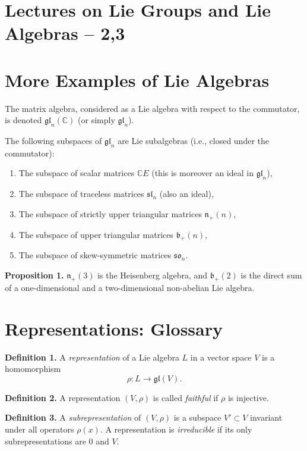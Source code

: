 \section*{Lectures on Lie Groups and Lie Algebras – 2,3}

\section*{More Examples of Lie Algebras}

The matrix algebra, considered as a Lie algebra with respect to the commutator,
is denoted $\mathfrak{gl}_n(\mathbb{C})$ (or simply $\mathfrak{gl}_n$).

The following subspaces of $\mathfrak{gl}_n$ are Lie subalgebras (i.e., closed under the commutator):

\begin{enumerate}
\item The subspace of scalar matrices $\mathbb{C}E$ (this is moreover an ideal in $\mathfrak{gl}_n$),
\item The subspace of traceless matrices $\mathfrak{sl}_n$ (also an ideal),
\item The subspace of strictly upper triangular matrices $\mathfrak{n}_+(n)$,
\item The subspace of upper triangular matrices $\mathfrak{b}_+(n)$,
\item The subspace of skew-symmetric matrices $\mathfrak{so}_n$.
\end{enumerate}

\textbf{Proposition 1.}
$\mathfrak{n}_+(3)$ is the Heisenberg algebra, and
$\mathfrak{b}_+(2)$ is the direct sum of a one-dimensional and a two-dimensional non-abelian Lie algebra.

\section*{Representations: Glossary}

\textbf{Definition 1.}
A \emph{representation} of a Lie algebra $L$ in a vector space $V$ is a homomorphism
\[
\rho : L \to \mathfrak{gl}(V).
\]

\textbf{Definition 2.}
A representation $(V,\rho)$ is called \emph{faithful} if $\rho$ is injective.

\textbf{Definition 3.}
A \emph{subrepresentation} of $(V,\rho)$ is a subspace $V' \subset V$ invariant under all operators $\rho(x)$.
A representation is \emph{irreducible} if its only subrepresentations are $0$ and $V$.

